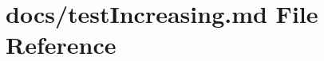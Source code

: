 \hypertarget{test_increasing_8md}{}\section{docs/test\+Increasing.md File Reference}
\label{test_increasing_8md}
